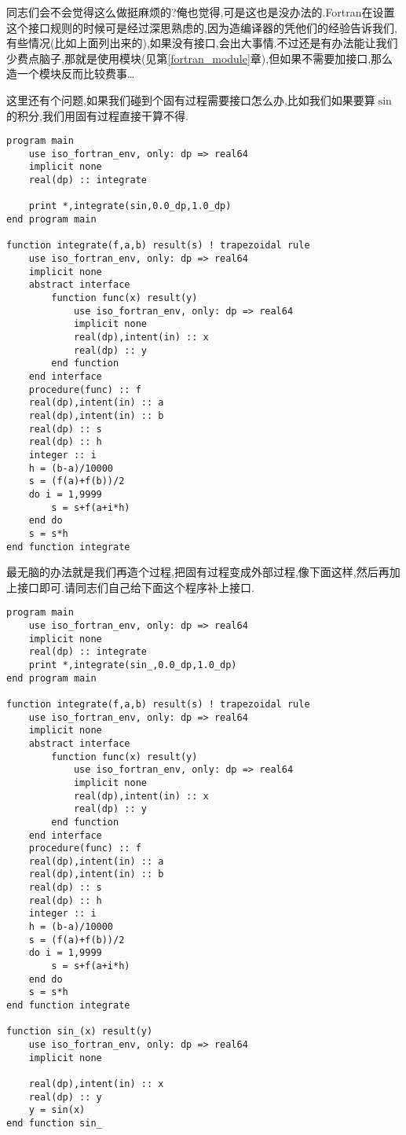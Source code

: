 同志们会不会觉得这么做挺麻烦的?俺也觉得,可是这也是没办法的.Fortran在设置这个接口规则的时候可是经过深思熟虑的,因为造编译器的凭他们的经验告诉我们,有些情况(比如上面列出来的),如果没有接口,会出大事情.不过还是有办法能让我们少费点脑子,那就是使用模块(见第\ref{fortran_module}章),但如果不需要加接口,那么造一个模块反而比较费事\dots

这里还有个问题,如果我们碰到个固有过程需要接口怎么办,比如我们如果要算$\sin$的积分,我们用固有过程直接干算不得.
\begin{lstlisting}
program main
    use iso_fortran_env, only: dp => real64
    implicit none
    real(dp) :: integrate

    print *,integrate(sin,0.0_dp,1.0_dp)
end program main

function integrate(f,a,b) result(s) ! trapezoidal rule
    use iso_fortran_env, only: dp => real64
    implicit none
    abstract interface
        function func(x) result(y)
            use iso_fortran_env, only: dp => real64
            implicit none
            real(dp),intent(in) :: x
            real(dp) :: y
        end function
    end interface
    procedure(func) :: f
    real(dp),intent(in) :: a
    real(dp),intent(in) :: b
    real(dp) :: s
    real(dp) :: h
    integer :: i
    h = (b-a)/10000
    s = (f(a)+f(b))/2
    do i = 1,9999
        s = s+f(a+i*h)
    end do
    s = s*h
end function integrate
\end{lstlisting}
最无脑的办法就是我们再造个过程,把固有过程变成外部过程,像下面这样,然后再加上接口即可.请同志们自己给下面这个程序补上接口.
\begin{lstlisting}
program main
    use iso_fortran_env, only: dp => real64
    implicit none
    real(dp) :: integrate
    print *,integrate(sin_,0.0_dp,1.0_dp)
end program main

function integrate(f,a,b) result(s) ! trapezoidal rule
    use iso_fortran_env, only: dp => real64
    implicit none
    abstract interface
        function func(x) result(y)
            use iso_fortran_env, only: dp => real64
            implicit none
            real(dp),intent(in) :: x
            real(dp) :: y
        end function
    end interface
    procedure(func) :: f
    real(dp),intent(in) :: a
    real(dp),intent(in) :: b
    real(dp) :: s
    real(dp) :: h
    integer :: i
    h = (b-a)/10000
    s = (f(a)+f(b))/2
    do i = 1,9999
        s = s+f(a+i*h)
    end do
    s = s*h
end function integrate

function sin_(x) result(y)
    use iso_fortran_env, only: dp => real64
    implicit none

    real(dp),intent(in) :: x
    real(dp) :: y
    y = sin(x)
end function sin_
\end{lstlisting}

